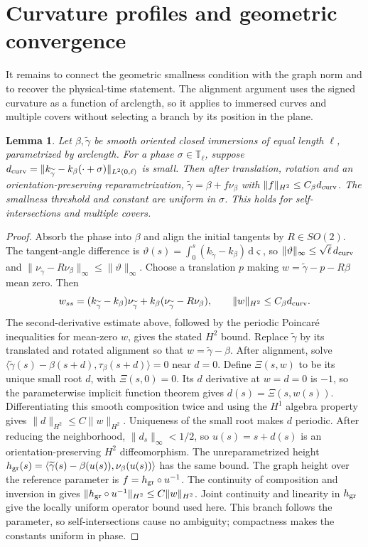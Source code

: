 \documentclass[a4paper,11pt]{article}
\numberwithin{equation}{section}
\newtheorem{lemma}[theorem]{Lemma}
\theoremstyle{definition}
\theoremstyle{remark}
\newcommand{\T}{\mathbb T}
\newcommand{\dd}{\,\mathrm d}
\newcommand{\norm}[1]{\lVert#1\rVert}
\newcommand{\ip}[2]{\langle#1,#2\rangle}
\begin{document}
\section{Curvature profiles and geometric convergence}\label{sec:geometric}
It remains to connect the geometric smallness condition with the graph norm and to recover the physical-time statement. The alignment argument uses the signed curvature as a function of arclength, so it applies to immersed curves and multiple covers without selecting a branch by its position in the plane.
\begin{lemma}\label{lem:curvature-entry}
Let $\beta,\widetilde\gamma$ be smooth oriented closed immersions of equal length $\ell$, parametrized by arclength. For a phase $\sigma\in\T_\ell$, suppose $d_{\rm curv}=\norm{k_{\widetilde\gamma}-k_\beta(\cdot+\sigma)}_{L^2(0,\ell)}$ is small. Then after translation, rotation and an orientation-preserving reparametrization, $\widetilde\gamma=\beta+f\nu_\beta$ with $\norm f_{H^2}\le C_\beta d_{\rm curv}$. The smallness threshold and constant are uniform in $\sigma$. This holds for self-intersections and multiple covers.
\end{lemma}
\begin{proof}
Absorb the phase into $\beta$ and align the initial tangents by $R\in SO(2)$. The tangent-angle difference is $\vartheta(s)=\int_0^s(k_{\widetilde\gamma}-k_\beta)\dd\varsigma$, so $\norm\vartheta_\infty\le\sqrt\ell\,d_{\rm curv}$ and $\norm{\nu_{\widetilde\gamma}-R\nu_\beta}_\infty\le\norm\vartheta_\infty$. Choose a translation $p$ making $w=\widetilde\gamma-p-R\beta$ mean zero. Then
\[
 w_{ss}=(k_{\widetilde\gamma}-k_\beta)\nu_{\widetilde\gamma}+k_\beta(\nu_{\widetilde\gamma}-R\nu_\beta),
 \qquad \norm w_{H^2}\le C_\beta d_{\rm curv}.
\]
The second-derivative estimate above, followed by the periodic Poincar\'e inequalities for mean-zero $w$, gives the stated $H^2$ bound. Replace $\widetilde\gamma$ by its translated and rotated alignment so that $w=\widetilde\gamma-\beta$. After alignment, solve $\ip{\widetilde\gamma(s)-\beta(s+d)}{\tau_\beta(s+d)}=0$ near $d=0$. Define $\Xi(s,w)$ to be its unique small root $d$, with $\Xi(s,0)=0$. Its $d$ derivative at $w=d=0$ is $-1$, so the parameterwise implicit function theorem gives $d(s)=\Xi(s,w(s))$. Differentiating this smooth composition twice and using the $H^1$ algebra property gives $\norm d_{H^2}\le C\norm w_{H^2}$. Uniqueness of the small root makes $d$ periodic. After reducing the neighborhood, $\norm{d_s}_\infty<1/2$, so $u(s)=s+d(s)$ is an orientation-preserving $H^2$ diffeomorphism. The unreparametrized height $h_{\rm gr}(s)=\ip{\widetilde\gamma(s)-\beta(u(s))}{\nu_\beta(u(s))}$ has the same bound. The graph height over the reference parameter is $f=h_{\rm gr}\circ u^{-1}$. The continuity of composition and inversion in \cite[Theorem~1.2, $s=2,r=0$]{IKT} gives $\norm{h_{\rm gr}\circ u^{-1}}_{H^2}\le C\norm w_{H^2}$. Joint continuity and linearity in $h_{\rm gr}$ give the locally uniform operator bound used here. This branch follows the parameter, so self-intersections cause no ambiguity; compactness makes the constants uniform in phase.
\end{proof}
\end{document}
